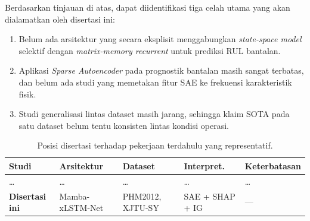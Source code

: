 Berdasarkan tinjauan di atas, dapat diidentifikasi tiga celah utama
yang akan dialamatkan oleh disertasi ini:

\begin{enumerate}
  \item Belum ada arsitektur yang secara eksplisit menggabungkan
        \emph{state-space model} selektif dengan \emph{matrix-memory
        recurrent} untuk prediksi RUL bantalan.
  \item Aplikasi \emph{Sparse Autoencoder} pada prognostik bantalan
        masih sangat terbatas, dan belum ada studi yang memetakan
        fitur SAE ke frekuensi karakteristik fisik.
  \item Studi generalisasi lintas dataset masih jarang, sehingga
        klaim SOTA pada satu dataset belum tentu konsisten lintas
        kondisi operasi.
\end{enumerate}

\begin{table}[ht]
\centering
\caption{Posisi disertasi terhadap pekerjaan terdahulu yang representatif.}
\label{tab:bab2_posisi}
\small
\begin{tabular}{@{}p{2.2cm}p{2cm}p{2cm}p{2.2cm}p{4cm}@{}}
\toprule
Studi & Arsitektur & Dataset & Interpret. & Keterbatasan \\
\midrule
\dots & \dots & \dots & \dots & \dots \\
\midrule
\textbf{Disertasi ini} & Mamba-xLSTM-Net & PHM2012, XJTU-SY & SAE + SHAP + IG & --- \\
\bottomrule
\end{tabular}
\end{table}
